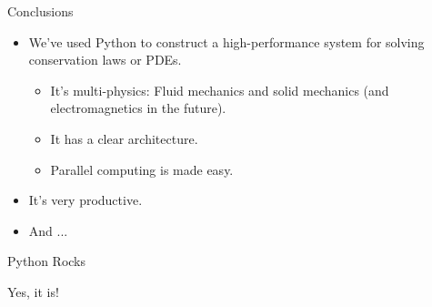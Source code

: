\documentclass[dvips,xcolor=pst,14pt]{beamer}
\begin{document}
\begin{frame}{
%
Conclusions
%
}
\begin{itemize}
  \item We've used Python to construct a high-performance system for solving
  conservation laws or PDEs.
  \begin{itemize} \normalsize
    \item It's multi-physics: Fluid mechanics and solid mechanics (and
    electromagnetics in the future).
    \item It has a clear architecture.
    \item Parallel computing is made easy.
  \end{itemize}
  \item It's very \alert{productive}.
  \item And ...
\end{itemize}
\end{frame}

\begin{frame}{
%
Python Rocks
%
}
\begin{center} \Huge
  Yes, it is!
\end{center}
\end{frame}
\end{document}

